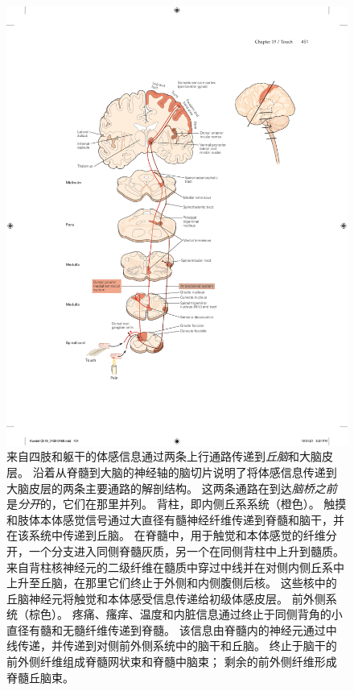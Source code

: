 \begin{figure}[htbp]
	\centering
	\includegraphics[width=1.0\linewidth]{chap19/fig_19_11}
	\caption{来自四肢和躯干的体感信息通过两条上行通路传递到\textit{丘脑}和大脑皮层。
		沿着从脊髓到大脑的神经轴的脑切片说明了将体感信息传递到大脑皮层的两条主要通路的解剖结构。
		这两条通路在到达\textit{脑桥之前}是\textit{分开}的，它们在那里并列。
		背柱，即内侧丘系系统（橙色）。
		触摸和肢体本体感觉信号通过大直径有髓神经纤维传递到脊髓和脑干，并在该系统中传递到丘脑。
		在脊髓中，用于触觉和本体感觉的纤维分开，一个分支进入同侧脊髓灰质，另一个在同侧背柱中上升到髓质。 
		来自背柱核神经元的二级纤维在髓质中穿过中线并在对侧内侧丘系中上升至丘脑，在那里它们终止于外侧和内侧腹侧后核。
		这些核中的丘脑神经元将触觉和本体感受信息传递给初级体感皮层。 前外侧系统（棕色）。
		疼痛、瘙痒、温度和内脏信息通过终止于同侧背角的小直径有髓和无髓纤维传递到脊髓。
		该信息由脊髓内的神经元通过中线传递，并传递到对侧前外侧系统中的脑干和丘脑。
		终止于脑干的前外侧纤维组成脊髓网状束和脊髓中脑束； 剩余的前外侧纤维形成脊髓丘脑束。}
	\label{fig:19_11}
\end{figure}




